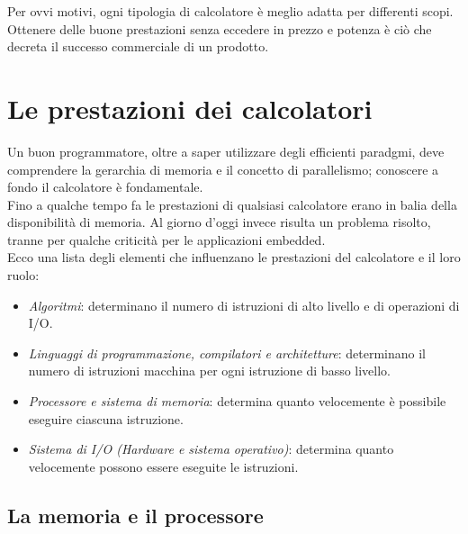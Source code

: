 \documentclass[class=book, crop=false]{standalone}
\begin{document}
Per ovvi motivi, ogni tipologia di calcolatore è meglio adatta per differenti scopi. Ottenere delle buone prestazioni senza eccedere in prezzo e potenza è ciò che decreta il successo commerciale di un prodotto.

\section{Le prestazioni dei calcolatori}
Un buon programmatore, oltre a saper utilizzare degli efficienti paradgmi, deve comprendere la gerarchia di memoria e il concetto di parallelismo; conoscere a fondo il calcolatore è fondamentale.\\
Fino a qualche tempo fa le prestazioni di qualsiasi calcolatore erano in balia della disponibilità di memoria. Al giorno d'oggi invece risulta un problema risolto, tranne per qualche criticità per le applicazioni embedded.\\
Ecco una lista degli elementi che influenzano le prestazioni del calcolatore e il loro ruolo:
\begin{itemize}[noitemsep, nolistsep]
	\item \emph{Algoritmi}: determinano il numero di istruzioni di alto livello e di operazioni di I/O.
	\item \emph{Linguaggi di programmazione, compilatori e architetture}: determinano il numero di istruzioni macchina per ogni istruzione di basso livello.
	\item \emph{Processore e sistema di memoria}: determina quanto velocemente è possibile eseguire ciascuna istruzione.
	\item \emph{Sistema di I/O (Hardware e sistema operativo)}: determina quanto velocemente possono essere eseguite le istruzioni.
\end{itemize}

\subsection{La memoria e il processore}
\end{document}
